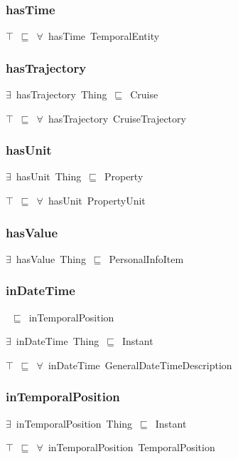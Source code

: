 \documentclass{article}
\begin{document}
\subsubsection*{hasTime}

\ensuremath{\top}~\ensuremath{\sqsubseteq}~\ensuremath{\forall}~hasTime~TemporalEntity

\subsubsection*{hasTrajectory}

\ensuremath{\exists}~hasTrajectory~Thing~\ensuremath{\sqsubseteq}~Cruise

\ensuremath{\top}~\ensuremath{\sqsubseteq}~\ensuremath{\forall}~hasTrajectory~CruiseTrajectory

\subsubsection*{hasUnit}

\ensuremath{\exists}~hasUnit~Thing~\ensuremath{\sqsubseteq}~Property

\ensuremath{\top}~\ensuremath{\sqsubseteq}~\ensuremath{\forall}~hasUnit~PropertyUnit

\subsubsection*{hasValue}

\ensuremath{\exists}~hasValue~Thing~\ensuremath{\sqsubseteq}~PersonalInfoItem

\subsubsection*{inDateTime}

~\ensuremath{\sqsubseteq}~inTemporalPosition

\ensuremath{\exists}~inDateTime~Thing~\ensuremath{\sqsubseteq}~Instant

\ensuremath{\top}~\ensuremath{\sqsubseteq}~\ensuremath{\forall}~inDateTime~GeneralDateTimeDescription

\subsubsection*{inTemporalPosition}

\ensuremath{\exists}~inTemporalPosition~Thing~\ensuremath{\sqsubseteq}~Instant

\ensuremath{\top}~\ensuremath{\sqsubseteq}~\ensuremath{\forall}~inTemporalPosition~TemporalPosition
\end{document}
